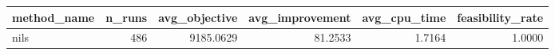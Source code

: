 \begin{tabular}{lrrrrr}
\toprule
method_name & n_runs & avg_objective & avg_improvement & avg_cpu_time & feasibility_rate \\
\midrule
nils & 486 & 9185.0629 & 81.2533 & 1.7164 & 1.0000 \\
\bottomrule
\end{tabular}
